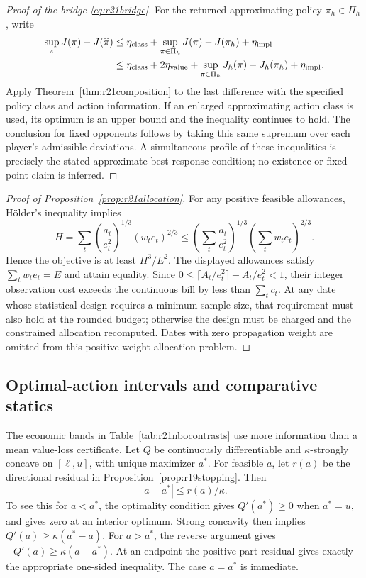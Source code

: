 \documentclass[ecta,nameyear,draft]{econsocart}
\theoremstyle{definition}
\theoremstyle{remark}
\begin{document}
\begin{proof}[Proof of the bridge \eqref{eq:r21bridge}]
For the returned approximating policy $\pi_h\in\Pi_h$, write
\begin{align*}
 \sup_\pi J(\pi)-J(\widehat\pi)
 &\leq\eta_{\rm class}
       +\sup_{\pi\in\Pi_h}J(\pi)-J(\pi_h)+\eta_{\rm impl}\\
 &\leq\eta_{\rm class}+2\eta_{\rm value}
       +\sup_{\pi\in\Pi_h}J_h(\pi)-J_h(\pi_h)+\eta_{\rm impl}.
\end{align*}
Apply Theorem~\ref{thm:r21composition} to the last difference with the
specified policy class and action information. If an enlarged approximating
action class is used, its optimum is an upper bound and the inequality
continues to hold. The conclusion for fixed opponents follows by taking this
same supremum over each player's admissible deviations. A simultaneous
profile of these inequalities is precisely the stated approximate
best-response condition; no existence or fixed-point claim is inferred.
\end{proof}

\begin{proof}[Proof of Proposition~\ref{prop:r21allocation}]
For any positive feasible allowances, H\"older's inequality implies
\[
 H=\sum_t\left(\frac{a_t}{e_t^2}\right)^{1/3}
                    (w_te_t)^{2/3}
 \leq\left(\sum_t\frac{a_t}{e_t^2}\right)^{1/3}
                    \left(\sum_tw_te_t\right)^{2/3}.
\]
Hence the objective is at least $H^3/E^2$. The displayed allowances satisfy
$\sum_tw_te_t=E$ and attain equality. Since
$0\leq\lceil A_t/e_t^2\rceil-A_t/e_t^2<1$, their integer observation cost
exceeds the continuous bill by less than $\sum_tc_t$. At any date whose
statistical design requires a minimum sample size, that requirement must
also hold at the rounded budget; otherwise the design must be charged and
the constrained allocation recomputed. Dates with zero propagation weight
are omitted from this positive-weight allocation problem.
\end{proof}

\subsection{Optimal-action intervals and comparative statics}
The economic bands in Table~\ref{tab:r21nbocontrasts} use more information
than a mean value-loss certificate. Let $Q$ be continuously differentiable
and $\kappa$-strongly concave on $[\ell,u]$, with unique maximizer $a^*$.
For feasible $a$, let $r(a)$ be the directional residual in
Proposition~\ref{prop:r19stopping}. Then
\begin{equation}
 |a-a^*|\leq r(a)/\kappa.
 \label{eq:r21actionradius}
\end{equation}
To see this for $a<a^*$, the optimality condition gives $Q'(a^*)\geq0$
when $a^*=u$, and gives zero at an interior optimum. Strong concavity then
implies $Q'(a)\geq\kappa(a^*-a)$. For $a>a^*$, the reverse argument gives
$-Q'(a)\geq\kappa(a-a^*)$. At an endpoint the positive-part residual gives
exactly the appropriate one-sided inequality. The case $a=a^*$ is immediate.
\end{document}
